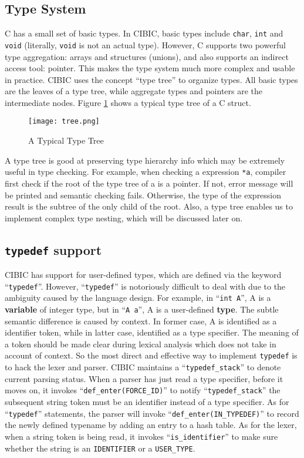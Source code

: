 \documentclass[10pt, a4paper]{article}
\begin{document}
\subsection{Type System}
C has a small set of basic types. In CIBIC, basic types include \texttt{char},
\texttt{int} and \texttt{void} (literally, \texttt{void} is not an actual
type). However, C supports two powerful type aggregation: arrays and structures
(unions), and also supports an indirect access tool: pointer. This makes the
type system much more complex and usable in practice. CIBIC uses the concept
``type tree'' to organize types. All basic types are the leaves of a type tree,
while aggregate types and pointers are the intermediate nodes. Figure
\ref{fig:type_tree} shows a typical type tree of a C struct.

\begin{figure}
    \centering
    \texttt{[image: tree.png]}
    \caption{A Typical Type Tree}
    \label{fig:type_tree}
\end{figure}

A type tree is good at preserving type hierarchy info which may be extremely
useful in type checking. For example, when checking a expression \texttt{*a},
compiler first check if the root of the type tree of a is a pointer. If not,
error message will be printed and semantic checking fails. Otherwise, the type
of the expression result is the subtree of the only child of the root. Also, a
type tree enables us to implement complex type nesting, which will be discussed
later on.
\subsection{\texttt{typedef} support}
CIBIC has support for user-defined types, which are defined via the keyword
``\texttt{typedef}''.  However, ``\texttt{typedef}'' is notoriously difficult
to deal with due to the ambiguity caused by the language design. For example,
in ``\texttt{int A}'', A is a \textbf{variable} of integer type, but in
``\texttt{A a}'', A is a user-defined \textbf{type}. The subtle semantic
difference is caused by context. In former case, A is identified as a
identifier token, while in latter case, identified as a type specifier. The
meaning of a token should be made clear during lexical analysis which does not
take in account of context. So the most direct and effective way to implement
\texttt{typedef} is to hack the lexer and parser. CIBIC maintains a
``\texttt{typedef\_stack}'' to denote current parsing status. When a parser has
just read a type specifier, before it moves on, it invokes
``\texttt{def\_enter(FORCE\_ID)}'' to notify ``\texttt{typedef\_stack}'' the
subsequent string token must be an identifier instead of a type specifier. As
for ``\texttt{typedef}'' statements, the parser will invoke
``\texttt{def\_enter(IN\_TYPEDEF)}'' to record the newly defined typename by
adding an entry to a hash table. As for the lexer, when a string token is being
read, it invokes ``\texttt{is\_identifier}'' to make sure whether the string is
an \texttt{IDENTIFIER} or a \texttt{USER\_TYPE}.
\end{document}
